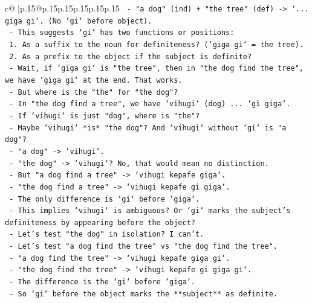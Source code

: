 \documentclass{article}
\begin{document}
{\begin{supertabular}{c@{$\;$}|p{.15\linewidth}@{}p{.15\linewidth}p{.15\linewidth}p{.15\linewidth}p{.15\linewidth}p{.15\linewidth}}
{{{\texttt{                {-} "a dog" (ind) + "the tree" (def) {-}> `... giga gi`. (No `gi` before object).} \\
\texttt{              {-} This suggests `gi` has two functions or positions:} \\
\texttt{                1. As a suffix to the noun for definiteness? (`giga gi` = the tree).} \\
\texttt{                2. As a prefix to the object if the subject is definite?} \\
\texttt{              {-} Wait, if `giga gi` is "the tree", then in "the dog find the tree", we have `giga gi` at the end. That works.} \\
\texttt{              {-} But where is the "the" for "the dog"?} \\
\texttt{              {-} In "the dog find a tree", we have `vihugi` (dog) ... `gi giga`.} \\
\texttt{              {-} If `vihugi` is just "dog", where is "the"?} \\
\texttt{              {-} Maybe `vihugi` *is* "the dog"? And `vihugi` without `gi` is "a dog"?} \\
\texttt{                {-} "a dog" {-}> `vihugi`.} \\
\texttt{                {-} "the dog" {-}> `vihugi`? No, that would mean no distinction.} \\
\texttt{                {-} But "a dog find a tree" {-}> `vihugi kepafe giga`.} \\
\texttt{                {-} "the dog find a tree" {-}> `vihugi kepafe gi giga`.} \\
\texttt{                {-} The only difference is `gi` before `giga`.} \\
\texttt{                {-} This implies `vihugi` is ambiguous? Or `gi` marks the subject's definiteness by appearing before the object?} \\
\texttt{                {-} Let's test "the dog" in isolation? I can't.} \\
\texttt{                {-} Let's test "a dog find the tree" vs "the dog find the tree".} \\
\texttt{                  {-} "a dog find the tree" {-}> `vihugi kepafe giga gi`.} \\
\texttt{                  {-} "the dog find the tree" {-}> `vihugi kepafe gi giga gi`.} \\
\texttt{                  {-} The difference is the `gi` before `giga`.} \\
\texttt{                  {-} So `gi` before the object marks the **subject** as definite.} \\
}}}
\end{supertabular}}
\end{document}
